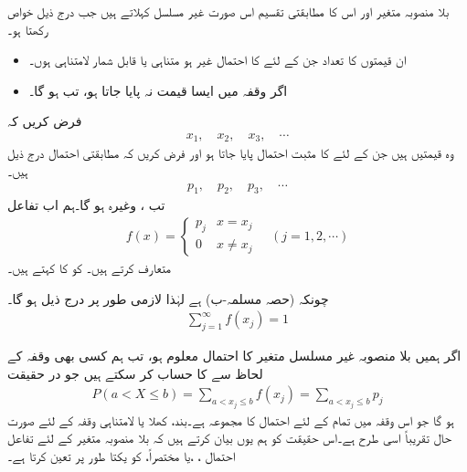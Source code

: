 بلا منصوبہ متغیر  اور اس کا مطابقتی تقسیم اس صورت غیر مسلسل کہلاتے ہیں جب  درج ذیل خواص رکھتا ہو۔
\begin{itemize}
\item
ان قیمتوں کا تعداد جن کے لئے  کا احتمال غیر  ہو متناہی یا قابل شمار لامتناہی ہوں۔\\
\item
اگر وقفہ  میں ایسا قیمت نہ پایا جاتا ہو، تب  ہو گا۔ 
\end{itemize}

فرض کریں کہ
\begin{align*}
x_1,\quad x_2,\quad x_3,\quad \cdots
\end{align*}
وہ قیمتیں ہیں جن کے لئے  کا مثبت احتمال پایا جاتا ہو اور فرض کریں کہ مطابقتی احتمال درج ذیل ہیں۔
\begin{align*}
p_1,\quad p_2,\quad p_3,\quad \cdots
\end{align*}
تب ، وغیرہ ہو گا۔ہم اب تفاعل
\begin{align}\label{مساوات_شماریات_غیر_مسلسل_متغیر_ب}
f(x)=
\begin{cases}
p_j& x=x_j\\
0&x\ne x_j
\end{cases}\quad
 (j=1,2,\cdots)
\end{align}
متعارف کرتے ہیں۔ کو  کا  کہتے ہیں۔

چونکہ  (حصہ  مسلمہ-ب) ہے لہٰذا لازمی طور پر درج ذیل ہو گا۔
\begin{align}\label{مساوات_شماریات_غیر_مسلسل_متغیر_پ}
\sum_{j=1}^{\infty} f(x_j)=1
\end{align}

اگر ہمیں بلا منصوبہ غیر مسلسل متغیر  کا احتمال معلوم ہو، تب ہم کسی بھی وقفہ  کے لحاظ سے   کا حساب کر سکتے ہیں جو در حقیقت
\begin{align}\label{مساوات_شماریات_غیر_مسلسل_متغیر_ت}
P(a<X\le b)=\sum_{a<x_j\le b} f(x_j)=\sum_{a<x_j\le b} p_j
\end{align}
ہو گا جو اس وقفہ میں تمام  کے لئے احتمال  کا مجموعہ ہے۔بند، کھلا یا لامتناہی وقفہ کے لئے صورت حال تقریباً اسی طرح ہے۔اس حقیقت کو ہم یوں بیان کرتے ہیں کہ بلا منصوبہ متغیر  کے لئے  تفاعل احتمال ،  ،یا مختصراً،   کو یکتا طور پر تعین کرتا ہے۔

